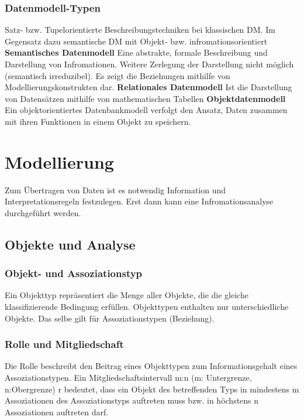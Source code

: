 \documentclass[a4paper,10pt]{scrartcl}
\begin{document}
\subsubsection{Datenmodell-Typen} 
Satz- bzw. Tupelorientierte Beschreibungstechniken bei klassischen DM.\newline
Im Gegensatz dazu semantische DM mit Objekt- bzw. infromationsorientiert
\newline\textbf{Semantisches Datenmodell}\newline
Eine abstrakte, formale Beschreibung und Darstellung von Infromationen. Weitere Zerlegung der Darstellung nicht möglich (semantisch irreduzibel). Es zeigt die Beziehungen mithilfe von Modellierungskonstrukten dar.
\newline\textbf{Relationales Datenmodell} \newline
Ist die Darstellung von Datensätzen mithilfe von mathematischen Tabellen
\newline\textbf{Objektdatenmodell}\newline
Ein objektorientiertes Datenbankmodell verfolgt den Ansatz, Daten zusammen mit ihren Funktionen in einem Objekt zu speichern.
\newpage
\section{Modellierung}
Zum Übertragen von Daten ist es notwendig Information und Interpretationsregeln festzulegen. Erst dann kann eine Infromationsanalyse durchgeführt werden.  
\subsection{Objekte und Analyse}
\subsubsection{Objekt- und Assoziationstyp}
Ein Objekttyp repräsentiert die Menge aller Objekte, die die gleiche klassifizierende Bedingung erfüllen. 
Objekttypen enthalten nur unterschiedliche Objekte. Das selbe gilt für Assoziationstypen (Beziehung).
\subsubsection{Rolle und Mitgliedschaft}
Die Rolle beschreibt den Beitrag eines Objekttypen zum Informationsgehalt eines Assoziationstypen. Ein Mitgliedschaftsintervall m:n (m: Untergrenze, n:Obergrenze) r bedeutet, dass ein Objekt des betreffenden Typs in mindestens m Assoziationen des Assoziationstyps auftreten muss bzw. in höchstens n Assoziationen auftreten darf.
\end{document}
